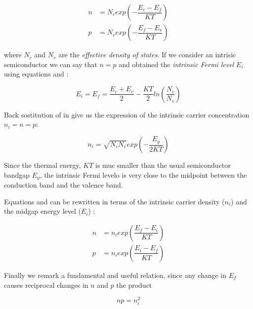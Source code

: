 \begin{align}
n & = N_c exp\left(-\dfrac{E_c-E_f}{KT}\right) \label{eq: n density fd}\\
p & = N_v exp\left(-\dfrac{E_f-E_v}{KT}\right)  \label{eq: p density fd}
\end{align}

where $N_c$ and $N_v$ are the \textit{effective density of states}.
If we consider an intrisic semiconductor we can say that $n=p$ and obtained the \textit{intrinsic Fermi level} $E_i$ using equations  and :

\begin{equation}
\label{eq: midgap equilibrium}
E_i=E_f=\dfrac{E_c+E_v}{2} - \dfrac{KT}{2}ln\left(\dfrac{N_c}{N_v}\right)
\end{equation}

Back sostitution of  in  give us the expression of the intrinsic carrier concentration $n_i=n=p$:


\begin{equation}
\label{eq: ni equilibrium NcNv}
n_i = \sqrt{N_cN_v}exp\left(-\dfrac{E_g}{2KT}\right)
\end{equation}

\begin{Osservazione}
Since the thermal energy, $KT$ is muc smaller than the usual semiconductor bandgap $E_g$, the intrinsic Fermi levelo is very close to the midpoint between the conduction band and the valence band.
\end{Osservazione}

Equations  and  can be rewritten in terms of the intrinsic carrier density ($n_i$) and the midgap energy level ($E_i$) :

\begin{align}
n & = n_i exp\left(\dfrac{E_f-E_i}{KT}\right) \label{eq: n density mb}\\
p & = n_i exp\left(\dfrac{E_i-E_f}{KT}\right)  \label{eq: p density mb}
\end{align}

Finally we remark a fundamental and useful relation, since any change in $E_f$ causes reciprocal changes in $n$ and $p$ the product

\begin{equation}
\label{eq: legge di azione di massa}
np=n_i^2
\end{equation}

